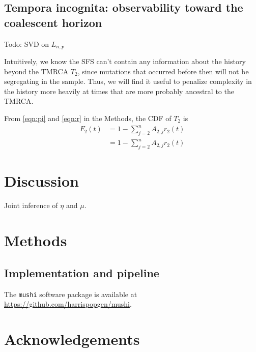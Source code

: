\documentclass[11pt]{article}
\begin{document}
\subsection*{Tempora incognita: observability toward the coalescent horizon}\label{sec:model:loss}

Todo: SVD on $L_{n, \boldsymbol y}$

Intuitively, we know the SFS can't contain any information about the history beyond the TMRCA $T_2$, since mutations that occurred before then will not be segregating in the sample.
Thus, we will find it useful to penalize complexity in the history more heavily at times that are more probably ancestral to the TMRCA.

From \eqref{eqn:pi} and \eqref{eqn:r} in the Methods, the CDF of $T_2$ is
\begin{align}
F_2(t) &= 1 - \sum_{j=2}^n A_{2,j}r_2(t)\\
&= 1 - \sum_{j=2}^n A_{2,j}r_2(t)
\end{align}


\section*{Discussion}\label{sec:discussion}

Joint inference of $\eta$ and $\mu$.


\section*{Methods}\label{sec:methods}

\subsection*{Implementation and pipeline}\label{sec:methods:tool}

The \texttt{mushi} software package is available at \url{https://github.com/harrispopgen/mushi}.

\section*{Acknowledgements}\label{sec:ack}





\appendix

\end{document}
